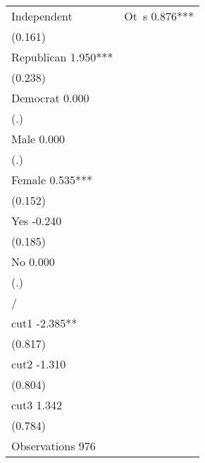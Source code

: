 \begin{table}[H]
\begin{tabular}{l*{1}{c}}
Independent & Ot~s        0.876***\\
                        (0.161)   \\
Republican                1.950***\\
                        (0.238)   \\
Democrat                  0.000   \\
                            (.)   \\
Male                      0.000   \\
                            (.)   \\
Female                    0.535***\\
                        (0.152)   \\
Yes                      -0.240   \\
                        (0.185)   \\
No                        0.000   \\
                            (.)   \\
\hline
/                                 \\
cut1                     -2.385** \\
                        (0.817)   \\
cut2                     -1.310   \\
                        (0.804)   \\
cut3                      1.342   \\
                        (0.784)   \\
\midrule
Observations                976   \\
\bottomrule\end{tabular}\end{table}
